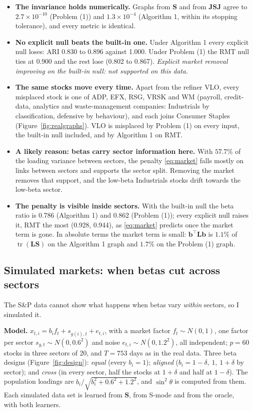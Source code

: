 \documentclass[11pt,a4paper]{article}
\newcommand{\Lap}{\mathbf{L}}
\newcommand{\Smat}{\mathbf{S}}
\newcommand{\Jmat}{\mathbf{J}}
\newcommand{\bvec}{\mathbf{b}}
\newcommand{\tr}{\operatorname{tr}}
\theoremstyle{remark}
\begin{document}
\begin{itemize}
\item \textbf{The invariance holds numerically.} Graphs from $\Smat$ and from
  $\Jmat\Smat\Jmat$ agree to $2.7\times10^{-10}$ (Problem (1)) and $1.3\times10^{-4}$
  (Algorithm 1, within its stopping tolerance), and every metric is identical.
\item \textbf{No explicit null beats the built-in one.} Under Algorithm 1 every explicit
  null loses: ARI 0.830 to 0.896 against 1.000. Under Problem (1) the RMT null ties at
  0.900 and the rest lose (0.802 to 0.867). \emph{Explicit market removal improving on the
  built-in null: not supported on this data.}
\item \textbf{The same stocks move every time.} Apart from the refiner VLO, every
  misplaced stock is one of ADP, EFX, RSG, VRSK and WM (payroll, credit-data, analytics
  and waste-management companies: Industrials by classification, defensive by
  behaviour), and each joins Consumer Staples (Figure~\ref{fig:realgraphs}). VLO is
  misplaced by Problem (1) on every input, the built-in null included, and by
  Algorithm 1 on RMT.
\item \textbf{A likely reason: betas carry sector information here.} With $57.7\%$ of
  the loading variance between sectors, the penalty \eqref{eq:market} falls mostly on
  links between sectors and supports the sector split. Removing the market removes that
  support, and the low-beta Industrials stocks drift towards the low-beta sector.
\item \textbf{The penalty is visible inside sectors.} With the built-in null the beta
  ratio is 0.786 (Algorithm 1) and 0.862 (Problem (1)); every explicit null raises it,
  RMT the most (0.928, 0.944), as \eqref{eq:market} predicts once the market term is
  gone. In absolute terms the market term is small: $\bvec^\top\Lap\bvec$ is $1.1\%$ of
  $\tr(\Lap\Smat)$ on the Algorithm 1 graph and $1.7\%$ on the Problem (1) graph.
\end{itemize}

\subsection{Simulated markets: when betas cut across sectors}\label{sec:synthetic}

The S\&P data cannot show what happens when betas vary \emph{within} sectors, so I
simulated it.

\textbf{Model.} $x_{t,i}=b_if_t+s_{g(i),t}+e_{t,i}$, with a market factor
$f_t\sim N(0,1)$, one factor per sector $s_{g,t}\sim N(0,0.6^2)$ and noise
$e_{t,i}\sim N(0,1.2^2)$, all independent; $p=60$ stocks in three sectors of 20, and
$T=753$ days as in the real data. Three beta designs (Figure~\ref{fig:design}):
\emph{equal} (every $b_i=1$); \emph{aligned} ($b_i=1-\delta,\ 1,\ 1+\delta$ by sector);
and \emph{cross} (in every sector, half the stocks at $1+\delta$ and half at $1-\delta$).
The population loadings are $b_i/\sqrt{b_i^2+0.6^2+1.2^2}$, and $\sin^2\theta$ is
computed from them. Each simulated data set is learned from $\Smat$, from S-mode and
from the oracle, with both learners.
\end{document}

